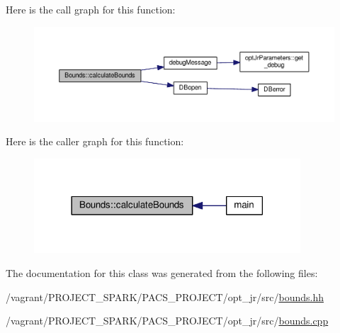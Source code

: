 Here is the call graph for this function\-:\nopagebreak
\begin{figure}[H]
\begin{center}
\leavevmode
\includegraphics[width=350pt]{classBounds_a64948c32dbb742f849656362391650bd_cgraph}
\end{center}
\end{figure}




Here is the caller graph for this function\-:\nopagebreak
\begin{figure}[H]
\begin{center}
\leavevmode
\includegraphics[width=282pt]{classBounds_a64948c32dbb742f849656362391650bd_icgraph}
\end{center}
\end{figure}




The documentation for this class was generated from the following files\-:\begin{DoxyCompactItemize}
\item 
/vagrant/\-P\-R\-O\-J\-E\-C\-T\-\_\-\-S\-P\-A\-R\-K/\-P\-A\-C\-S\-\_\-\-P\-R\-O\-J\-E\-C\-T/opt\-\_\-jr/src/\hyperlink{bounds_8hh}{bounds.\-hh}\item 
/vagrant/\-P\-R\-O\-J\-E\-C\-T\-\_\-\-S\-P\-A\-R\-K/\-P\-A\-C\-S\-\_\-\-P\-R\-O\-J\-E\-C\-T/opt\-\_\-jr/src/\hyperlink{bounds_8cpp}{bounds.\-cpp}\end{DoxyCompactItemize}
